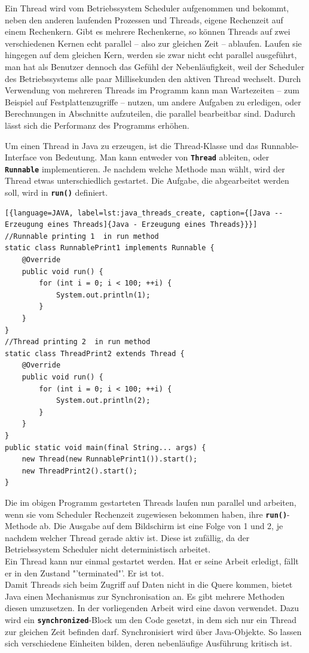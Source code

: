 \documentclass[
							a4paper, 
							11pt, 
							openany, 
							liststotoc,
							parskip=half, 
   							headings=normal
						]{scrreprt}
\begin{document}
{Ein Thread wird vom Betriebssystem Scheduler aufgenommen und bekommt, neben den anderen laufenden Prozessen und Threads, eigene Rechenzeit auf einem Rechenkern.
Gibt es mehrere Rechenkerne, so können Threads auf zwei verschiedenen Kernen echt parallel -- also zur gleichen Zeit -- ablaufen. Laufen sie hingegen auf dem gleichen Kern, werden sie zwar nicht echt parallel ausgeführt, man hat als Benutzer dennoch das Gefühl der Nebenläufigkeit, weil der Scheduler des Betriebssystems alle paar Millisekunden den aktiven Thread wechselt.\newline
Durch Verwendung von mehreren Threads im Programm kann man Wartezeiten -- zum Beispiel auf Festplattenzugriffe -- nutzen, um andere Aufgaben zu erledigen, oder Berechnungen in Abschnitte aufzuteilen, die parallel bearbeitbar sind. Dadurch lässt sich die Performanz des Programms erhöhen. \cite{openbook:multithreading_nebenlaeufigkeit}

Um einen Thread in Java zu erzeugen, ist die Thread-Klasse und das Runnable-Interface von Bedeutung. Man kann entweder von \textbf{\texttt{Thread}} ableiten, oder \textbf{\texttt{Runnable}} implementieren. Je nachdem welche Methode man wählt, wird der Thread etwas unterschiedlich gestartet. Die Aufgabe, die abgearbeitet werden soll, wird in \textbf{\texttt{run()}} definiert. \cite{openbook:multithreading_erzeugen}\bigskip

\begin{lstlisting}[{language=JAVA, label=lst:java_threads_create, caption={[Java -- Erzeugung eines Threads]{Java - Erzeugung eines Threads}}}]
//Runnable printing 1  in run method
static class RunnablePrint1 implements Runnable {
	@Override
	public void run() {
		for (int i = 0; i < 100; ++i) {
			System.out.println(1);
		}
	}
}
//Thread printing 2  in run method
static class ThreadPrint2 extends Thread {
	@Override
	public void run() {
		for (int i = 0; i < 100; ++i) {
			System.out.println(2);
		}
	}
}
public static void main(final String... args) {		
	new Thread(new RunnablePrint1()).start();
	new ThreadPrint2().start();
}
\end{lstlisting}

Die im obigen Programm gestarteten Threads laufen nun parallel und arbeiten, wenn sie vom Scheduler Rechenzeit zugewiesen bekommen haben, ihre \textbf{\texttt{run()}}-Methode ab.
Die Ausgabe auf dem Bildschirm ist eine Folge von 1 und 2, je nachdem welcher Thread gerade aktiv ist. Diese ist zufällig, da der Betriebssystem Scheduler nicht deterministisch arbeitet.\cite{openbook:multithreading_erzeugen}\\
Ein Thread kann nur einmal gestartet werden. Hat er seine Arbeit erledigt, fällt er in den Zustand "'terminated"'. Er ist tot.\\
Damit Threads sich beim Zugriff auf Daten nicht in die Quere kommen, bietet Java einen Mechanismus zur Synchronisation an. Es gibt mehrere Methoden diesen umzusetzen. In der vorliegenden Arbeit wird eine davon verwendet. Dazu wird ein \textbf{\texttt{synchronized}}-Block um den Code gesetzt, in dem sich nur ein Thread zur gleichen Zeit befinden darf. Synchronisiert wird über Java-Objekte. So lassen sich verschiedene Einheiten bilden, deren nebenläufige Ausführung kritisch ist. \cite{openbook:multithreading_synchronisation}

}
\end{document}
